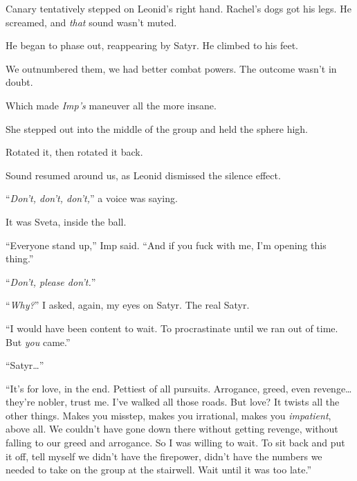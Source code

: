 Canary tentatively stepped on Leonid's right hand.  Rachel's dogs got his legs.  He screamed, and \emph{that} sound wasn't muted.



He began to phase out, reappearing by Satyr.  He climbed to his feet.



We outnumbered them, we had better combat powers.  The outcome wasn't in doubt.



Which made \emph{Imp's} maneuver all the more insane.



She stepped out into the middle of the group and held the sphere high.



Rotated it, then rotated it back.



Sound resumed around us, as Leonid dismissed the silence effect.



``\emph{Don't, don't, don't,}'' a voice was saying.



It was Sveta, inside the ball.



``Everyone stand up,'' Imp said.  ``And if you fuck with me, I'm opening this thing.''



``\emph{Don't, please don't.}''



``\emph{Why?}''  I asked, again, my eyes on Satyr.  The real Satyr.



``I would have been content to wait.  To procrastinate until we ran out of time.  But \emph{you} came.''



``Satyr\ldots''



``It's for love, in the end.  Pettiest of all pursuits.  Arrogance, greed, even revenge\ldots they're nobler, trust me.  I've walked all those roads.  But love?  It twists all the other things.  Makes you misstep, makes you irrational, makes you \emph{impatient}, above all.  We couldn't have gone down there without getting revenge, without falling to our greed and arrogance.  So I was willing to wait.  To sit back and put it off, tell myself we didn't have the firepower, didn't have the numbers we needed to take on the group at the stairwell.  Wait until it was too late.''



